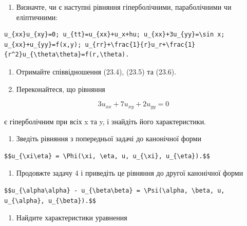\documentclass[
  ukrainian,
]{article}
\providecommand{\tightlist}{%
  \setlength{\itemsep}{0pt}\setlength{\parskip}{0pt}}
\begin{document}
\begin{enumerate}
\def\labelenumi{\arabic{enumi}.}
\tightlist
\item
  Визначте, чи є наступні рівняння гіперболічними, параболічними чи
  еліптичними:
\end{enumerate}

\begin{verbatim}
u_{xx}u_{xy}=0; u_{tt}=u_{xx}+u_x+hu; u_{xx}+3u_{yy}=\sin x; u_{xx}+u_{yy}=f(x,y); u_{rr}+\frac{1}{r}u_r+\frac{1}{r^2}u_{\theta\theta}=f(r,\theta).
\end{verbatim}

\begin{enumerate}
\def\labelenumi{\arabic{enumi}.}
\setcounter{enumi}{1}
\item
  Отримайте співвідношення (23.4), (23.5) та (23.6).
\item
  Переконайтеся, що рівняння
\end{enumerate}

\[3u_{xx} + 7u_{xy} + 2u_{yy} = 0\]

є гіперболічним при всіх x та y, і знайдіть його характеристики.

\begin{enumerate}
\def\labelenumi{\arabic{enumi}.}
\setcounter{enumi}{3}
\tightlist
\item
  Зведіть рівняння з попередньої задачі до канонічної форми
\end{enumerate}

\begin{verbatim}
$$u_{\xi\eta} = \Phi(\xi, \eta, u, u_{\xi}, u_{\eta}).$$
\end{verbatim}

\begin{enumerate}
\def\labelenumi{\arabic{enumi}.}
\setcounter{enumi}{4}
\tightlist
\item
  Продовжте задачу 4 і приведіть це рівняння до другої канонічної форми
\end{enumerate}

\begin{verbatim}
$$u_{\alpha\alpha} - u_{\beta\beta} = \Psi(\alpha, \beta, u, u_{\alpha}, u_{\beta}).$$
\end{verbatim}

\begin{enumerate}
\def\labelenumi{\arabic{enumi}.}
\setcounter{enumi}{5}
\tightlist
\item
  Найдите характеристики уравнения
\end{enumerate}
\end{document}
